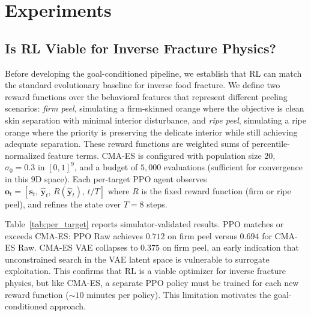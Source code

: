 

% 


\section{Experiments}
\label{sec:experiments}

\subsection{Is RL Viable for Inverse Fracture Physics?}
\label{sec:rl_viable}

Before developing the goal-conditioned pipeline, we establish that RL can match the standard evolutionary baseline for inverse food fracture. We define two reward functions over the behavioral features that represent different peeling scenarios: \emph{firm peel}, simulating a firm-skinned orange where the objective is clean skin separation with minimal interior disturbance, and \emph{ripe peel}, simulating a ripe orange where the priority is preserving the delicate interior while still achieving adequate separation. These reward functions are weighted sums of percentile-normalized feature terms. CMA-ES is configured with population size $20$, $\sigma_0{=}0.3$ in $[0,1]^9$, and a budget of $5{,}000$ evaluations (sufficient for convergence in this $9$D space). Each per-target PPO agent observes $\mathbf{o}_t = [\mathbf{s}_t,\, \hat{\mathbf{y}}_t,\, R(\hat{\mathbf{y}}_t),\, t/T]$ where $R$ is the fixed reward function (firm or ripe peel), and refines the state over $T{=}8$ steps.

Table~\ref{tab:per_target} reports simulator-validated results. PPO matches or exceeds CMA-ES: PPO Raw achieves $0.712$ on firm peel versus $0.694$ for CMA-ES Raw. CMA-ES VAE collapses to $0.375$ on firm peel, an early indication that unconstrained search in the VAE latent space is vulnerable to surrogate exploitation. This confirms that RL is a viable optimizer for inverse fracture physics, but like CMA-ES, a separate PPO policy must be trained for each new reward function (${\sim}10$ minutes per policy). This limitation motivates the goal-conditioned approach.

